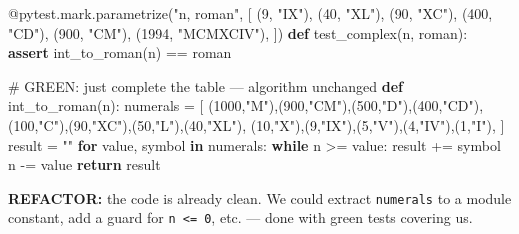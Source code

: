 \documentclass[11pt]{article}
\newenvironment{Shaded}{\begin{snugshade}}{\end{snugshade}}
\newcommand{\AttributeTok}[1]{\textcolor[rgb]{0.16,0.50,0.73}{#1}}
\newcommand{\CommentTok}[1]{\textcolor[rgb]{0.48,0.49,0.49}{#1}}
\newcommand{\ControlFlowTok}[1]{\textcolor[rgb]{0.99,0.74,0.29}{\textbf{#1}}}
\newcommand{\DecValTok}[1]{\textcolor[rgb]{0.96,0.45,0.00}{#1}}
\newcommand{\KeywordTok}[1]{\textcolor[rgb]{0.81,0.81,0.76}{\textbf{#1}}}
\newcommand{\NormalTok}[1]{\textcolor[rgb]{0.81,0.81,0.76}{#1}}
\newcommand{\OperatorTok}[1]{\textcolor[rgb]{0.81,0.81,0.76}{#1}}
\newcommand{\StringTok}[1]{\textcolor[rgb]{0.96,0.31,0.31}{#1}}
\begin{document}
\begin{Shaded}
\begin{Highlighting}[]
\AttributeTok{@pytest.mark.parametrize}\NormalTok{(}\StringTok{"n, roman"}\NormalTok{, [}
\NormalTok{    (}\DecValTok{9}\NormalTok{, }\StringTok{"IX"}\NormalTok{), (}\DecValTok{40}\NormalTok{, }\StringTok{"XL"}\NormalTok{), (}\DecValTok{90}\NormalTok{, }\StringTok{"XC"}\NormalTok{),}
\NormalTok{    (}\DecValTok{400}\NormalTok{, }\StringTok{"CD"}\NormalTok{), (}\DecValTok{900}\NormalTok{, }\StringTok{"CM"}\NormalTok{), (}\DecValTok{1994}\NormalTok{, }\StringTok{"MCMXCIV"}\NormalTok{),}
\NormalTok{])}
\KeywordTok{def}\NormalTok{ test\_complex(n, roman):}
    \ControlFlowTok{assert}\NormalTok{ int\_to\_roman(n) }\OperatorTok{==}\NormalTok{ roman}

\CommentTok{\# GREEN: just complete the table — algorithm unchanged}
\KeywordTok{def}\NormalTok{ int\_to\_roman(n):}
\NormalTok{    numerals }\OperatorTok{=}\NormalTok{ [}
\NormalTok{        (}\DecValTok{1000}\NormalTok{,}\StringTok{"M"}\NormalTok{),(}\DecValTok{900}\NormalTok{,}\StringTok{"CM"}\NormalTok{),(}\DecValTok{500}\NormalTok{,}\StringTok{"D"}\NormalTok{),(}\DecValTok{400}\NormalTok{,}\StringTok{"CD"}\NormalTok{),}
\NormalTok{        (}\DecValTok{100}\NormalTok{,}\StringTok{"C"}\NormalTok{),(}\DecValTok{90}\NormalTok{,}\StringTok{"XC"}\NormalTok{),(}\DecValTok{50}\NormalTok{,}\StringTok{"L"}\NormalTok{),(}\DecValTok{40}\NormalTok{,}\StringTok{"XL"}\NormalTok{),}
\NormalTok{        (}\DecValTok{10}\NormalTok{,}\StringTok{"X"}\NormalTok{),(}\DecValTok{9}\NormalTok{,}\StringTok{"IX"}\NormalTok{),(}\DecValTok{5}\NormalTok{,}\StringTok{"V"}\NormalTok{),(}\DecValTok{4}\NormalTok{,}\StringTok{"IV"}\NormalTok{),(}\DecValTok{1}\NormalTok{,}\StringTok{"I"}\NormalTok{),}
\NormalTok{    ]}
\NormalTok{    result }\OperatorTok{=} \StringTok{""}
    \ControlFlowTok{for}\NormalTok{ value, symbol }\KeywordTok{in}\NormalTok{ numerals:}
        \ControlFlowTok{while}\NormalTok{ n }\OperatorTok{\textgreater{}=}\NormalTok{ value:}
\NormalTok{            result }\OperatorTok{+=}\NormalTok{ symbol}
\NormalTok{            n }\OperatorTok{{-}=}\NormalTok{ value}
    \ControlFlowTok{return}\NormalTok{ result}
\end{Highlighting}
\end{Shaded}

\textbf{REFACTOR:} the code is already clean. We could extract \texttt{numerals} to a module constant, add a guard for \texttt{n\ \textless{}=\ 0}, etc. --- done with green tests covering us.
\end{document}
